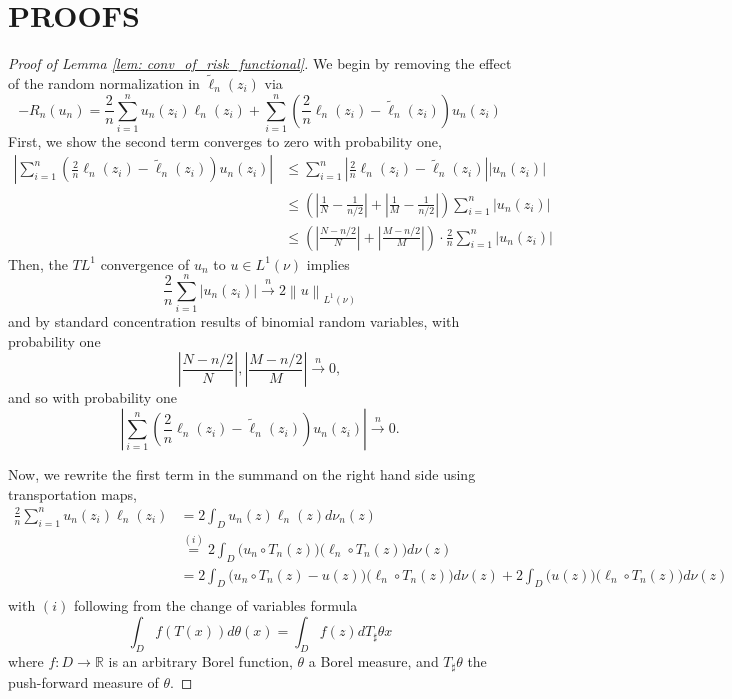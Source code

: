 \documentclass{article}
\newcommand{\Reals}{\mathbb{R}}
\newcommand{\norm}[1]{\left\lVert#1\right\rVert}
\newcommand{\abs}[1]{\left \lvert #1 \right \rvert}
\newcommand{\1}{\mathbf{1}}
\theoremstyle{alden}
\theoremstyle{aldenthm}
\theoremstyle{remark}
\begin{document}
\section{PROOFS}
\begin{proof}[Proof of Lemma \ref{lem: conv_of_risk_functional}]
	We begin by removing the effect of the random normalization in $\widetilde{\ell}_n(z_i)$ via
	\begin{equation*}
	- R_n(u_n) = \frac{2}{n} \sum_{i = 1}^{n} u_n(z_i) \ell_n(z_i) + \sum_{i = 1}^{n} \left(\frac{2}{n} \ell_n(z_i) - \widetilde{\ell}_n(z_i) \right)u_n(z_i)
	\end{equation*}
	First, we show the second term converges to zero with probability one,
	\begin{align*}
	\abs{\sum_{i = 1}^{n} \left(\frac{2}{n} \ell_n(z_i) - \widetilde{\ell}_n(z_i) \right)u_n(z_i)} & \leq \sum_{i = 1}^{n} \abs{\frac{2}{n} \ell_n(z_i) - \widetilde{\ell}_n(z_i)} \abs{u_n(z_i)} \\
	& \leq \left(\abs{\frac{1}{N} - \frac{1}{n/2}} + \abs{\frac{1}{M} - \frac{1}{n/2}}\right) \sum_{i = 1}^{n} \abs{u_n(z_i)} \\
	& \leq \left(\abs{\frac{N - n/2}{N}} + \abs{\frac{M - n/2}{M}}\right) \cdot \frac{2}{n} \sum_{i = 1}^{n}\abs{u_n(z_i)}
	\end{align*}
	Then, the $TL^1$ convergence of $u_n$ to $u \in L^1(\nu)$ implies
	\begin{equation*}
	\frac{2}{n} \sum_{i = 1}^{n}\abs{u_n(z_i)} \overset{n}{\to} 2 \norm{u}_{L^1(\nu)}
	\end{equation*}
	and by standard concentration results of binomial random variables, with probability one
	\begin{equation*}
	\abs{\frac{N - n/2}{N}}, \abs{\frac{M - n/2}{M}} \overset{n}{\to} 0,
	\end{equation*}
	and so with probability one
	\begin{equation*}
	\abs{\sum_{i = 1}^{n} \left(\frac{2}{n} \ell_n(z_i) - \widetilde{\ell}_n(z_i) \right)u_n(z_i)} \overset{n}{\to} 0.
	\end{equation*}
	
	Now, we rewrite the first term in the summand on the right hand side using transportation maps,
	\begin{align*}
	\frac{2}{n} \sum_{i = 1}^{n} u_n(z_i) \ell_n(z_i) & = 2 \int_D u_n(z) \ell_n(z) d\nu_n(z) \\
	& \overset{(i)}{=} 2 \int_D  \bigl(u_n \circ T_n (z) \bigr) \bigl( \ell_n \circ T_n (z)  \bigr) d\nu(z) \\
	& = 2 \int_D  \bigl(u_n \circ T_n (z)  - u(z) \bigr) \bigl( \ell_n \circ T_n (z)  \bigr) d\nu(z) + 2 \int_D  \bigl(u(z) \bigr) \bigl( \ell_n \circ T_n (z)  \bigr) d\nu(z) \\
	\end{align*}
	with $(i)$ following from the change of variables formula
	\begin{equation*}
	\int_D f(T(x)) d \theta(x) = \int_D f(z) d T_{\sharp} \theta x
	\end{equation*}
	where $f: D \to \Reals$ is an arbitrary Borel function, $\theta$ a Borel measure, and $T_{\sharp} \theta$ the push-forward measure of $\theta$. 
	

\end{proof}
\end{document}
